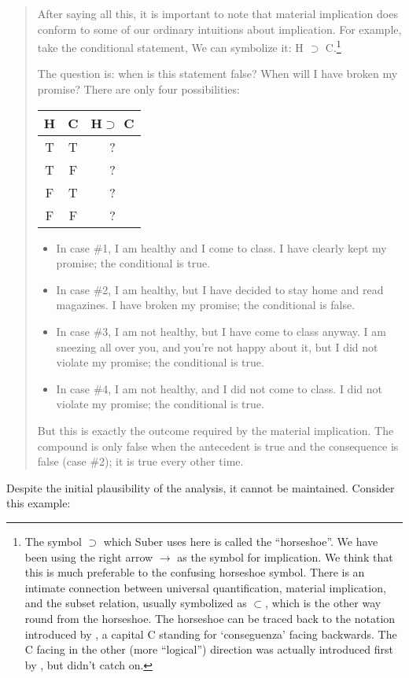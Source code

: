 \begin{quote}
	
	After saying all this, it is important to note that material implication does conform to some of our ordinary intuitions about implication. For example, take the conditional statement,  We can symbolize it: H $\supset$ C.\footnote{The symbol $\supset$ which Suber uses here is called the ``horseshoe''. We have been using the right arrow $\rightarrow$ as the symbol for implication. We think that this is much preferable to the confusing horseshoe symbol. There is an intimate connection between universal quantification, material implication, and the subset relation, usually symbolized as $\subset$, which is the other way round from the horseshoe. The horseshoe can be traced back to the notation introduced by \citet{peano:1889:nova}, a capital C standing for `conseguenza' facing backwards. The C facing in the other (more ``logical'') direction was actually introduced first by \citet{gergonne:1817:essai}, but didn't catch on.}
	
	The question is: when is this statement false? When will I have broken my promise? There are only four possibilities:
	
	\begin{center}
		\begin{tabular}
			{c|c||c} H & C & H$\supset$ C\\
			\hline T & T & ?\\
			T & F & ?\\
			F & T & ?\\
			F & F & ? 
		\end{tabular}
	\end{center}

\begin{itemize}
		
		\item In case \#1, I am healthy and I come to class. I have clearly kept my promise; the conditional is true. 
		\item In case \#2, I am healthy, but I have decided to stay home and read magazines. I have broken my promise; the conditional is false. 
		\item In case \#3, I am not healthy, but I have come to class anyway. I am sneezing all over you, and you're not happy about it, but I did not violate my promise; the conditional is true. 
		\item In case \#4, I am not healthy, and I did not come to class. I did not violate my promise; the conditional is true. 

\end{itemize}
%	
But this is exactly the outcome required by the material implication. The compound is only false when the antecedent is true and the consequence is false (case \#2); it is true every other time.

\end{quote}
%
Despite the initial plausibility of the analysis, it cannot be maintained. Consider this example:

